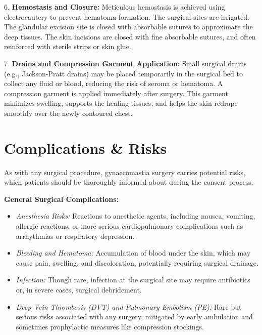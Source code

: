 \begin{enumerate}
  6.  \textbf{Hemostasis and Closure:} Meticulous hemostasis is achieved using electrocautery to prevent hematoma formation. The surgical sites are irrigated. The glandular excision site is closed with absorbable sutures to approximate the deep tissues. The skin incisions are closed with fine absorbable sutures, and often reinforced with sterile strips or skin glue.

  7.  \textbf{Drains and Compression Garment Application:} Small surgical drains (e.g., Jackson-Pratt drains) may be placed temporarily in the surgical bed to collect any fluid or blood, reducing the risk of seroma or hematoma. A compression garment is applied immediately after surgery. This garment minimizes swelling, supports the healing tissues, and helps the skin redrape smoothly over the newly contoured chest.
\end{enumerate}

\section*{Complications \& Risks}
As with any surgical procedure, gynaecomastia surgery carries potential risks, which patients should be thoroughly informed about during the consent process.

\textbf{General Surgical Complications:}
\begin{itemize}
  \item \textit{Anesthesia Risks:} Reactions to anesthetic agents, including nausea, vomiting, allergic reactions, or more serious cardiopulmonary complications such as arrhythmias or respiratory depression.
  \item \textit{Bleeding and Hematoma:} Accumulation of blood under the skin, which may cause pain, swelling, and discoloration, potentially requiring surgical drainage.
  \item \textit{Infection:} Though rare, infection at the surgical site may require antibiotics or, in severe cases, surgical debridement.
  \item \textit{Deep Vein Thrombosis (DVT) and Pulmonary Embolism (PE):} Rare but serious risks associated with any surgery, mitigated by early ambulation and sometimes prophylactic measures like compression stockings.
\end{itemize}

